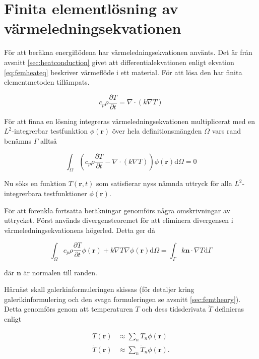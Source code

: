 \section{Finita elementlösning av värmeledningsekvationen}
\label{sec:femheat}
För att beräkna energiflödena har värmeledningsekvationen använts.
Det är från avsnitt \ref{sec:heatconduction} givet att differentialekvationen
enligt ekvation \eqref{eq:femheateq} beskriver värmeflöde i ett material.
För att lösa den har  finita elementmetoden tillämpats.
 
\begin{equation}
\label{eq:femheateq}
c_p\rho\frac{\partial T}{\partial t} = \nabla\cdot(k\nabla T)
\end{equation}

För att finna en lösning integreras värmeledningsekvationen
multiplicerat med en $L^2$-integrerbar testfunktion $\phi(\mathbf{r})$ över hela
definitionsmängden $\Omega$ vars rand benämns $\Gamma$ alltså

\begin{equation}
\label{eq:femheatweak}
\int_\Omega \left(c_p\rho\frac{\partial T}{\partial t} -
\nabla\cdot(k\nabla T)\right)\phi(\mathbf{r})\mathrm{d}\Omega = 0
\end{equation}

Nu söks en funktion $T(\mathbf{r},t)$ som satisfierar nyss nämnda uttryck för
alla $L^2$-integrerbara testfunktioner $\phi(\mathbf{r})$.

För att förenkla fortsatta beräkningar genomförs några
omskrivningar av uttrycket. Först används divergensteoremet för att 
eliminera divergensen i värmeledningsekvationens högerled. Detta ger då

\begin{equation}
\label{eq:femheatweakfull}
\int_\Omega c_p\rho\frac{\partial T}{\partial t}\phi(\mathbf{r}) +
k\nabla T\nabla\phi(\mathbf{r}) \mathrm{d}\Omega =
\int_\Gamma k\mathbf{n}\cdot\nabla T\mathrm{d}\Gamma
\end{equation}

där $\mathbf{n}$ är normalen till randen.

Härnäst skall galerkinformuleringen skissas (för detaljer kring galerikinformulering och den svaga formuleringen se avsnitt \ref{sec:femtheory}). Detta genomförs
genom att temperaturen $T$ och dess tidsderivata $\dot{T}$ definieras
enligt

\begin{align}
\label{eq:femheatt}
T(\mathbf{r}) & \approx \sum_n T_n\phi(\mathbf{r}) \\
\label{eq:femheattdot}
\dot{T}(\mathbf{r}) & \approx \sum_n \dot{T}_n\phi(\mathbf{r}).
\end{align}


